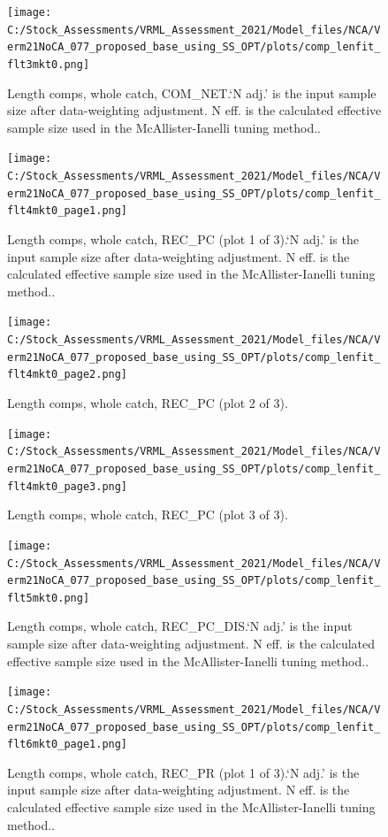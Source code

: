 \documentclass[
  english,
  a4paper,
]{article}
\begin{document}
\begin{figure}
\centering
\texttt{[image: C:/Stock\_Assessments/VRML\_Assessment\_2021/Model\_files/NCA/Verm21NoCA\_077\_proposed\_base\_using\_SS\_OPT/plots/comp\_lenfit\_flt3mkt0.png]}
\caption{Length comps, whole catch, COM\_NET.`N adj.' is the input sample size after data-weighting adjustment. N eff. is the calculated effective sample size used in the McAllister-Ianelli tuning method..\label{fig:comp_lenfit_flt3mkt0}}
\end{figure}

\begin{figure}
\centering
\texttt{[image: C:/Stock\_Assessments/VRML\_Assessment\_2021/Model\_files/NCA/Verm21NoCA\_077\_proposed\_base\_using\_SS\_OPT/plots/comp\_lenfit\_flt4mkt0\_page1.png]}
\caption{Length comps, whole catch, REC\_PC (plot 1 of 3).`N adj.' is the input sample size after data-weighting adjustment. N eff. is the calculated effective sample size used in the McAllister-Ianelli tuning method..\label{fig:comp_lenfit_flt4mkt0_page1}}
\end{figure}

\begin{figure}
\centering
\texttt{[image: C:/Stock\_Assessments/VRML\_Assessment\_2021/Model\_files/NCA/Verm21NoCA\_077\_proposed\_base\_using\_SS\_OPT/plots/comp\_lenfit\_flt4mkt0\_page2.png]}
\caption{Length comps, whole catch, REC\_PC (plot 2 of 3).\label{fig:comp_lenfit_flt4mkt0_page2}}
\end{figure}

\begin{figure}
\centering
\texttt{[image: C:/Stock\_Assessments/VRML\_Assessment\_2021/Model\_files/NCA/Verm21NoCA\_077\_proposed\_base\_using\_SS\_OPT/plots/comp\_lenfit\_flt4mkt0\_page3.png]}
\caption{Length comps, whole catch, REC\_PC (plot 3 of 3).\label{fig:comp_lenfit_flt4mkt0_page3}}
\end{figure}

\begin{figure}
\centering
\texttt{[image: C:/Stock\_Assessments/VRML\_Assessment\_2021/Model\_files/NCA/Verm21NoCA\_077\_proposed\_base\_using\_SS\_OPT/plots/comp\_lenfit\_flt5mkt0.png]}
\caption{Length comps, whole catch, REC\_PC\_DIS.`N adj.' is the input sample size after data-weighting adjustment. N eff. is the calculated effective sample size used in the McAllister-Ianelli tuning method..\label{fig:comp_lenfit_flt5mkt0}}
\end{figure}

\begin{figure}
\centering
\texttt{[image: C:/Stock\_Assessments/VRML\_Assessment\_2021/Model\_files/NCA/Verm21NoCA\_077\_proposed\_base\_using\_SS\_OPT/plots/comp\_lenfit\_flt6mkt0\_page1.png]}
\caption{Length comps, whole catch, REC\_PR (plot 1 of 3).`N adj.' is the input sample size after data-weighting adjustment. N eff. is the calculated effective sample size used in the McAllister-Ianelli tuning method..\label{fig:comp_lenfit_flt6mkt0_page1}}
\end{figure}
\end{document}
